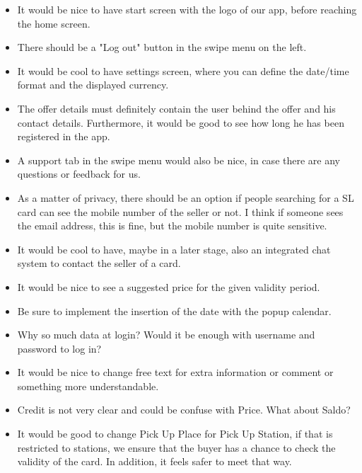 \documentclass[11pt,twoside,a4paper]{report}
\begin{document}
\begin{itemize}

\item It would be nice to have start screen with the logo of our app, before reaching the home screen.

\item There should be a "Log out" button in the swipe menu on the left.

\item It would be cool to have settings screen, where you can define the date/time format and the displayed currency.

\item The offer details must definitely contain the user behind the offer and his contact details. Furthermore, it would be good to see how long he has been registered in the app.

\item A support tab in the swipe menu would also be nice, in case there are any questions or feedback for us.

\item As a matter of privacy, there should be an option if people searching for a SL card can see the mobile number of the seller or not. I think if someone sees the email address, this is fine, but the mobile number is quite sensitive.

\item It would be cool to have, maybe in a later stage, also an integrated chat system to contact the seller of a card.

\item It would be nice to see a suggested price for the given validity period.

\item Be sure to implement the insertion of the date with the popup calendar.

\item Why so much data at login? Would it be enough with username and password to log in?

\item It would be nice to change free text for extra information or comment or something more understandable.

\item Credit is not very clear and could be confuse with Price. What about Saldo?

\item It would be good to change Pick Up Place for Pick Up Station, if that is restricted to stations, we ensure that the buyer has a chance to check the validity of the card. In addition, it feels safer to meet that way.


\end{itemize}
\end{document}
